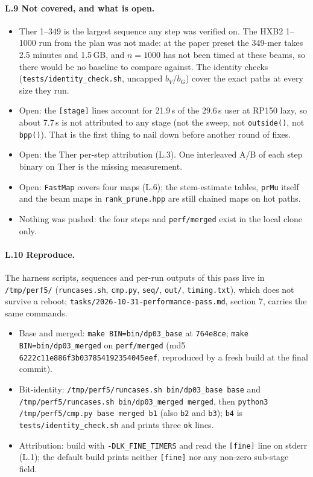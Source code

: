 \documentclass[11pt]{article}
\begin{document}
\paragraph{L.9 Not covered, and what is open.}
\begin{itemize}[leftmargin=*]
  \item Ther 1--349 is the largest sequence any step was verified on. The HXB2 1--1000 run from the plan was not made: at the paper preset the 349-mer takes 2.5 minutes and 1.5\,GB, and $n=1000$ has not been timed at these beams, so there would be no baseline to compare against. The identity checks (\texttt{tests/identity\_check.sh}, uncapped $b_V$/$b_G$) cover the exact paths at every size they run.
  \item Open: the \texttt{[stage]} lines account for 21.9\,s of the 29.6\,s user at RP150 lazy, so about 7.7\,s is not attributed to any stage (not the sweep, not \texttt{outside()}, not \texttt{bpp()}). That is the first thing to nail down before another round of fixes.
  \item Open: the Ther per-step attribution (L.3). One interleaved A/B of each step binary on Ther is the missing measurement.
  \item Open: \texttt{FastMap} covers four maps (L.6); the stem-estimate tables, \texttt{prMu} itself and the beam maps in \texttt{rank\_prune.hpp} are still chained maps on hot paths.
  \item Nothing was pushed: the four steps and \texttt{perf/merged} exist in the local clone only.
\end{itemize}

\paragraph{L.10 Reproduce.} The harness scripts, sequences and per-run outputs of this pass live in \texttt{/tmp/perf5/} (\texttt{runcases.sh}, \texttt{cmp.py}, \texttt{seq/}, \texttt{out/}, \texttt{timing.txt}), which does not survive a reboot; \texttt{tasks/2026-10-31-performance-pass.md}, section 7, carries the same commands.
\begin{itemize}[leftmargin=*]
  \item Base and merged: \texttt{make BIN=bin/dp03\_base} at \texttt{764e8ce}; \texttt{make BIN=bin/dp03\_merged} on \texttt{perf/merged} (md5 \texttt{6222c11e886f3b037854192354045eef}, reproduced by a fresh build at the final commit).
  \item Bit-identity: \texttt{/tmp/perf5/runcases.sh bin/dp03\_base base} and \texttt{/tmp/perf5/runcases.sh bin/dp03\_merged merged}, then \texttt{python3 /tmp/perf5/cmp.py base merged b1} (also \texttt{b2} and \texttt{b3}); \texttt{b4} is \texttt{tests/identity\_check.sh} and prints three \texttt{ok} lines.
  \item Attribution: build with \texttt{-DLK\_FINE\_TIMERS} and read the \texttt{[fine]} line on stderr (L.1); the default build prints neither \texttt{[fine]} nor any non-zero sub-stage field.
\end{itemize}
\end{document}
